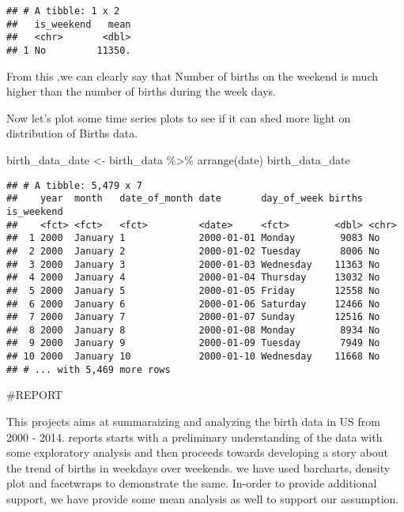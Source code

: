 \documentclass[
]{article}
\newenvironment{Shaded}{\begin{snugshade}}{\end{snugshade}}
\newcommand{\FunctionTok}[1]{\textcolor[rgb]{0.00,0.00,0.00}{#1}}
\newcommand{\NormalTok}[1]{#1}
\newcommand{\OtherTok}[1]{\textcolor[rgb]{0.56,0.35,0.01}{#1}}
\newcommand{\SpecialCharTok}[1]{\textcolor[rgb]{0.00,0.00,0.00}{#1}}
\begin{document}
\begin{verbatim}
## # A tibble: 1 x 2
##   is_weekend   mean
##   <chr>       <dbl>
## 1 No         11350.
\end{verbatim}

From this ,we can clearly say that Number of births on the weekend is
much higher than the number of births during the week days.

Now let's plot some time series plots to see if it can shed more light
on distribution of Births data.

\begin{Shaded}
\begin{Highlighting}[]
\NormalTok{birth\_data\_date }\OtherTok{\textless{}{-}}\NormalTok{ birth\_data }\SpecialCharTok{\%\textgreater{}\%} \FunctionTok{arrange}\NormalTok{(date)}
\NormalTok{birth\_data\_date}
\end{Highlighting}
\end{Shaded}

\begin{verbatim}
## # A tibble: 5,479 x 7
##    year  month   date_of_month date       day_of_week births is_weekend
##    <fct> <fct>   <fct>         <date>     <fct>        <dbl> <chr>     
##  1 2000  January 1             2000-01-01 Monday        9083 No        
##  2 2000  January 2             2000-01-02 Tuesday       8006 No        
##  3 2000  January 3             2000-01-03 Wednesday    11363 No        
##  4 2000  January 4             2000-01-04 Thursday     13032 No        
##  5 2000  January 5             2000-01-05 Friday       12558 No        
##  6 2000  January 6             2000-01-06 Saturday     12466 No        
##  7 2000  January 7             2000-01-07 Sunday       12516 No        
##  8 2000  January 8             2000-01-08 Monday        8934 No        
##  9 2000  January 9             2000-01-09 Tuesday       7949 No        
## 10 2000  January 10            2000-01-10 Wednesday    11668 No        
## # ... with 5,469 more rows
\end{verbatim}

\#REPORT

This projects aims at summaraizing and analyzing the birth data in US
from 2000 - 2014. reports starts with a preliminary understanding of the
data with some exploratory analysis and then proceeds towards developing
a story about the trend of births in weekdays over weekends. we have
used barcharts, density plot and facetwraps to demonstrate the same.
In-order to provide additional support, we have provide some mean
analysis as well to support our assumption.
\end{document}
